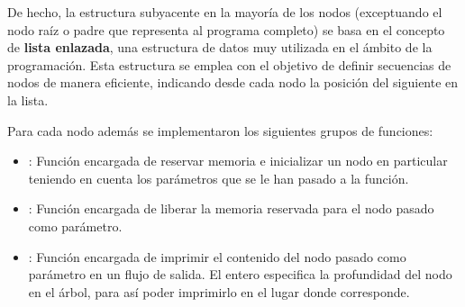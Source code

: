 \vspace{0.5cm}
De hecho, la estructura subyacente en la mayoría de los nodos (exceptuando el nodo raíz o padre que representa al programa completo) se basa en el concepto de \textbf{lista enlazada}, una estructura de datos muy utilizada en el ámbito de la programación. Esta estructura se emplea con el objetivo de definir secuencias de nodos de manera eficiente, indicando desde cada nodo la posición del siguiente en la lista.

\vspace{0.5cm}
\noindent
Para cada nodo además se implementaron los siguientes grupos de funciones:

\begin{itemize}
    \item {} : Función encargada de reservar memoria e inicializar un nodo en particular teniendo en cuenta los parámetros que se le han pasado a la función.
    \item {} : Función encargada de liberar la memoria reservada para el nodo pasado como parámetro.
    \item {} : Función encargada de imprimir el contenido del nodo pasado como parámetro en un flujo de salida. El entero  especifica la profundidad del nodo en el árbol, para así poder imprimirlo en el lugar donde corresponde.
\end{itemize}



